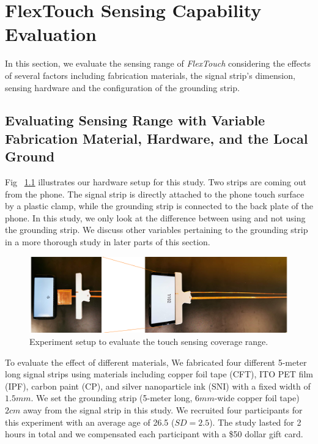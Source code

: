 \chapter{FlexTouch Sensing Capability Evaluation}
In this section, we evaluate the sensing range of \textit{FlexTouch} considering the effects of several factors including fabrication materials, the signal strip's dimension, sensing hardware and the configuration of the grounding strip.

\section{Evaluating Sensing Range with Variable Fabrication Material, Hardware, and the Local Ground}

Fig ~\ref{fig:experiment} illustrates our hardware setup for this study. Two strips are coming out from the phone. The signal strip is directly attached to the phone touch surface by a plastic clamp, while the grounding strip is connected to the back plate of the phone. In this study, we only look at the difference between using and not using the grounding strip. We discuss other variables pertaining to the  grounding strip in a more thorough study in later parts of this section. 

\begin{figure}[ht]
	\centering
	\includegraphics[width=0.95\columnwidth]{figures/evaluation_env.png}
	\setlength{\belowcaptionskip}{-6pt}
    \caption{Experiment setup to evaluate the touch sensing coverage range.}
    \label{fig:experiment}
\end{figure}
	
To evaluate the effect of different materials, We fabricated four different 5-meter long signal strips using materials including copper foil tape (CFT), ITO PET film (IPF), carbon paint (CP), and silver nanoparticle ink (SNI) with a fixed width of $1.5mm$. We set the grounding strip (5-meter long, $6mm$-wide copper foil tape) $2 cm$ away from the signal strip in this study. We recruited four participants for this experiment with an average age of 26.5 ($SD = 2.5$). The study lasted for 2 hours in total and we compensated each participant with a \$50 dollar gift card.

